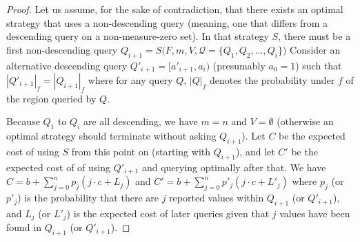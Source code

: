 \begin{proof}
Let us assume, for the sake of contradiction,
that there exists  an optimal strategy  that uses a 
non-descending query (meaning, one that differs from a descending query on
a non-measure-zero set).
In that strategy $S$, there must be a first non-descending query
$Q_{i+1} = S\big(F, m, V, \mathcal Q = \{Q_1, Q_2, \ldots, Q_i\}\big)$
Consider an alternative descending query
$Q'_{i+1} = [a'_{i+1}, a_i)$ (presumably $a_0 = 1$) such
that $|Q'_{i+1}|_f = |Q_{i+1}|_f$
where for any query $Q$, $|Q|_f$ denotes the probability under $f$ of the
region queried by $Q$.

Because $Q_1$ to $Q_i$ are all descending, we have $m = n$ and $V = \emptyset$ (otherwise
an optimal strategy should terminate without asking $Q_{i+1}$).
Let $C$ be the expected cost of using $S$ from this point on
(starting with $Q_{i+1}$), and let $C'$ be the expected cost of 
of using $Q'_{i+1}$ and querying
optimally after that. We have\\
$
C = b + \sum_{j=0}^n p_j ( j \cdot c + L_j)
$
and
$
C' = b + \sum_{j=0}^n p'_j ( j \cdot c + L'_j)
$
where
$p_j$ (or $p'_j$) is the probability that there are $j$ reported values
within $Q_{i+1}$ (or $Q'_{i+1}$), and
$L_j$ (or $L'_j$) is the expected cost of later queries given that $j$ values have been
found in $Q_{i+1}$ (or $Q'_{i+1}$).


\end{proof}
